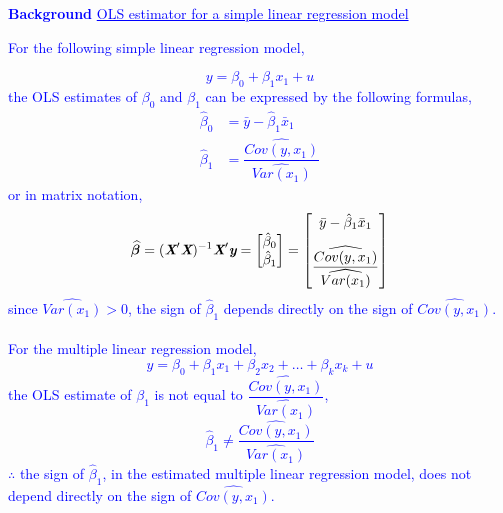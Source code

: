 \documentclass[12pt]{report}
\newenvironment{blueframed}[1][blue]
{\def\FrameCommand{\fboxsep=\FrameSep\fcolorbox{#1}{white}}%
	\MakeFramed {\advance\hsize-\width \FrameRestore}}
{\endMakeFramed}
\begin{document}
\justify
\begin{blueframed}
	\textcolor{blue}{\textbf{Background}}
	\vspace{-\baselineskip}
	\justify
	\textcolor{blue}{\underline{OLS estimator for a simple linear regression model}}
	
	\noindent \textcolor{blue}
	{
		\noindent For the following simple linear regression model, 
}\end{blueframed}

\justify
\begin{blueframed}
	\noindent \textcolor{blue}
	{
		\noindent $$y = \beta_0 + \beta_1 x_1 + u$$  the OLS estimates of $\beta_0$ and $\beta_1$ can be expressed by the following formulas,
		\begin{align*}
		\hat{\beta}_0 &= \bar{y} - \hat{\beta}_1\bar{x}_1 \\
		\hat{\beta}_1 &= \dfrac{\widehat{Cov(y,x_1)}}{\widehat{Var(x_1)}}
		\end{align*}
		or in matrix notation, $$\widehat{\boldsymbol{\beta}} 
		= (\textit{\textbf{X}}'\textit{\textbf{X}})^{-1}\textit{\textbf{X}}'\textit{\textbf{y}}
		=
		\begin{bmatrix}
		\hat{\beta}_0 \\
		\hat{\beta}_1 
		\end{bmatrix}
		=
		\begin{bmatrix}
		\bar{y} - \hat{\beta}_1\bar{x}_1 \\[10pt]
		\dfrac{\widehat{Cov(y,x_1)}}{\widehat{Var(x_1)}} 
		\end{bmatrix}$$
		since $\widehat{Var(x_1)}>0$, the sign of $\hat{\beta}_1$ depends directly on the sign of $\widehat{Cov(y,x_1)}$. \\ \\ For the multiple linear regression model, $$y = \beta_0 + \beta_1 x_1 + \beta_2 x_2 + \dots + \beta_k x_k + u$$ the OLS estimate of $\beta_1$ is not equal to $\dfrac{\widehat{Cov(y,x_1)}}{\widehat{Var(x_1)}}$, $$\hat{\beta}_1 \neq \dfrac{\widehat{Cov(y,x_1)}}{\widehat{Var(x_1)}}$$ $\therefore$ the sign of $\hat{\beta}_1$, in the estimated multiple linear regression model, does not depend directly on the sign of $\widehat{Cov(y,x_1)}$.
}\end{blueframed}
\end{document}
